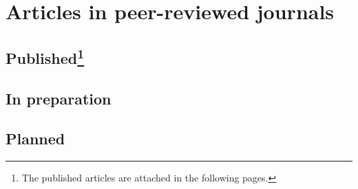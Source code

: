 \chapter{Articles in peer-reviewed journals}
            
\section*{Published\footnote{The published articles are attached in the following pages.}}

\begin{refsection}%
\nocite{*}
\printbibliography[keyword=publicado,heading=none] %
\end{refsection}%

\section*{In preparation}

\section*{Planned}














%
